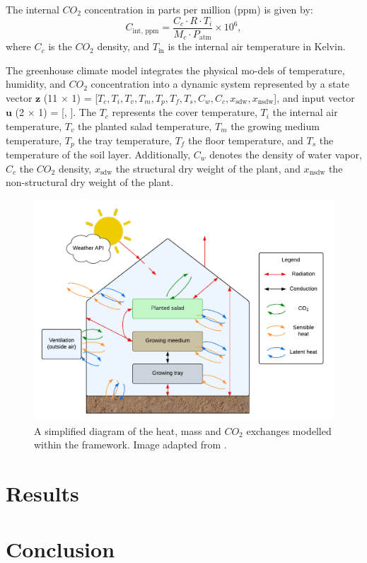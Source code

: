 \documentclass[conference]{IEEEtran}
\begin{document}
The internal $CO_2$ concentration in parts per million (ppm) is given by:
\begin{equation}
    C_{\text{int, ppm}} = \frac{C_c \cdot R \cdot T_i}{M_c \cdot P_{\text{atm}}} \times 10^6,
\end{equation}
where $C_c$ is the $CO_2$ density, and $T_{\text{in}}$ is the internal air temperature in Kelvin.

The greenhouse climate model integrates the physical mo-dels of temperature, humidity, and $CO_2$ concentration into a dynamic system represented by a state vector $\mathbf{z}$ (11 $\times$ 1) = [$T_c, T_i, T_v, T_m, T_p, T_f, T_s, C_w, C_c, x_{\text{sdw}}, x_{\text{nsdw}}$], and input vector $\mathbf{u}$ (2 $\times$ 1) = [, ]. The $T_c$ represents the cover temperature, $T_i$ the internal air temperature, $T_v$ the planted salad temperature, $T_m$ the growing medium temperature, $T_p$ the tray temperature, $T_f$ the floor temperature, and $T_s$ the temperature of the soil layer. Additionally, $C_w$ denotes the density of water vapor, $C_c$ the $CO_2$ density, $x_{\text{sdw}}$ the structural dry weight of the plant, and $x_{\text{nsdw}}$ the non-structural dry weight of the plant.

\begin{figure}
    \centering
    \includegraphics[width=.5\textwidth]{images/diagram.pdf}
    \caption{A simplified diagram of the heat, mass and $CO_2$ exchanges modelled within the framework. Image adapted from \cite{rmward61_2019}.}
    \label{fig:diagram}
\end{figure}

\section{Results}

\section{Conclusion}



\end{document}

